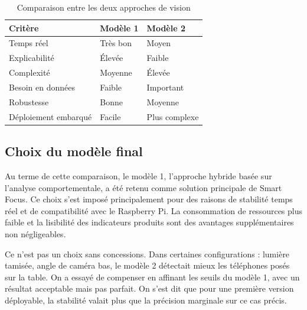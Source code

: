 \begin{table}[H]
\centering
\footnotesize
\renewcommand{\arraystretch}{1.15}

\begin{tabular}{|p{4cm}|p{4cm}|p{4cm}|}
\hline
\textbf{Critère} & \textbf{Modèle 1} & \textbf{Modèle 2} \\ \hline

Temps réel & Très bon & Moyen \\ \hline

Explicabilité & Élevée & Faible \\ \hline

Complexité & Moyenne & Élevée \\ \hline

Besoin en données & Faible & Important \\ \hline

Robustesse & Bonne & Moyenne \\ \hline

Déploiement embarqué & Facile & Plus complexe \\ \hline

\end{tabular}

\caption{Comparaison entre les deux approches de vision}
\label{tab:comparaison_modeles}
\end{table}

\subsection{Choix du modèle final}

Au terme de cette comparaison, le modèle 1, l’approche hybride basée sur l’analyse comportementale, a été retenu comme solution principale de Smart Focus. Ce choix s’est imposé principalement pour des raisons de stabilité temps réel et de compatibilité avec le Raspberry Pi. La consommation de ressources plus faible et la lisibilité des indicateurs produits sont des avantages supplémentaires non négligeables.

Ce n’est pas un choix sans concessions. Dans certaines configurations : lumière tamisée, angle de caméra bas, le modèle 2 détectait mieux les téléphones posés sur la table. On a essayé de compenser en affinant les seuils du modèle 1, avec un résultat acceptable mais pas parfait. On s’est dit que pour une première version déployable, la stabilité valait plus que la précision marginale sur ce cas précis.

